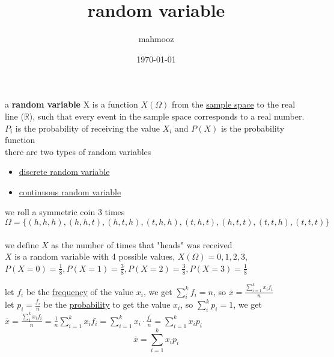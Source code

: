 \documentclass[11pt]{article}
\author{mahmooz}
\date{\today}
\title{random variable}
\begin{document}
\maketitle
\tableofcontents

\begin{definition}
a \textbf{random variable} X is a function \(X(\Omega)\) from the \href{probability.org}{sample space} to the real line (\(\mathbb{R}\)), such that every event in the sample space corresponds to a real number. \(P_i\) is the probability of receiving the value \(X_i\) and \(P(X)\) is the probability function\\[0pt]
there are two types of random variables\\[0pt]
\begin{itemize}
\item \href{20230121192455-discrete_random_variable.org}{discrete random variable}\\[0pt]
\item \href{20230128192014-continuous_random_variable.org}{continuous random variable}\\[0pt]
\end{itemize}
\begin{my_example}
we roll a symmetric coin 3 times\\[0pt]
\[
\Omega = \{(h,h,h),(h,h,t),(h,t,h),(t,h,h),(t,h,t),(h,t,t),(t,t,h),(t,t,t)\}
\]\\[0pt]
we define \(X\) as the number of times that "heads" was received\\[0pt]
\(X\) is a random variable with 4 possible values, \(X(\Omega)=0,1,2,3\), \(P(X=0)=\frac{1}{8},P(X=1)=\frac{3}{8},P(X=2)=\frac{3}{8},P(X=3)=\frac{1}{8}\)\\[0pt]
\end{my_example}
\begin{lemma}
let \(f_i\) be the \href{20230113185822-frequency.org}{frequency} of the value \(x_i\), we get \(\sum_{i}^{k} f_i = n\), so \(\overline{x} = \frac{\sum_{i=1}^{k} x_if_i}{n}\)\\[0pt]
let \(p_i=\frac{f_i}{n}\) be the \href{probability.org}{probability} to get the value \(x_i\), so \(\sum_{i}^{k} p_i=1\), we get \(\overline{x}=\frac{\sum_{1}^{k} x_if_i}{n}=\frac{1}{n}\sum_{i=1}^{k} x_if_i=\sum_{i=1}^{k} x_i \cdot \frac{f_i}{n}=\sum_{i=1}^{k} x_ip_i\)\\[0pt]
\[
\overline{x} = \sum_{i=1}^{k} x_ip_i
\]\\[0pt]
\end{lemma}
\begin{lemma}

\end{lemma}
\end{definition}
\end{document}
